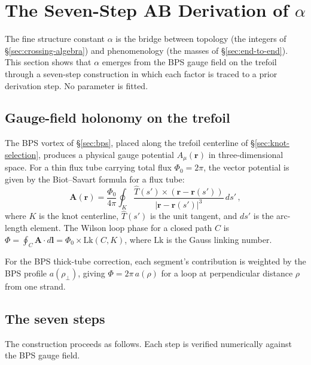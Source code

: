 \documentclass[11pt]{article}
\begin{document}
\section{The Seven-Step AB Derivation of $\alpha$}
\label{sec:holonomy}

The fine structure constant $\alpha$ is the bridge between topology
(the integers of \S\ref{sec:crossing-algebra}) and phenomenology
(the masses of \S\ref{sec:end-to-end}).  This section shows that
$\alpha$ emerges from the BPS gauge field on the trefoil through a
seven-step construction in which each factor is traced to a prior
derivation step.  No parameter is fitted.

\subsection{Gauge-field holonomy on the trefoil}

The BPS vortex of \S\ref{sec:bps}, placed along the trefoil
centerline of \S\ref{sec:knot-selection}, produces a physical
gauge potential $A_\mu(\mathbf{r})$ in three-dimensional space.
For a thin flux tube carrying total flux $\Phi_0 = 2\pi$, the
vector potential is given by the Biot--Savart formula for a flux
tube:
\begin{equation}
\label{eq:biot-savart}
  \mathbf{A}(\mathbf{r}) =
  \frac{\Phi_0}{4\pi}
  \oint_K \frac{\hat{T}(s') \times
    (\mathbf{r} - \mathbf{r}(s'))}{|\mathbf{r} - \mathbf{r}(s')|^3}
  \,ds'\,,
\end{equation}
where $K$ is the knot centerline, $\hat{T}(s')$ is the unit
tangent, and $ds'$ is the arc-length element.  The Wilson loop
phase for a closed path $C$ is
$\Phi = \oint_C \mathbf{A} \cdot d\mathbf{l}
= \Phi_0 \times \mathrm{Lk}(C, K)$,
where $\mathrm{Lk}$ is the Gauss linking number.

For the BPS thick-tube correction, each segment's contribution is
weighted by the BPS profile $a(\rho_\perp)$, giving
$\Phi = 2\pi \,a(\rho)$ for a loop at perpendicular distance
$\rho$ from one strand.

\subsection{The seven steps}
\label{sec:seven-steps}

The construction proceeds as follows.  Each step is verified
numerically against the BPS gauge field.
\end{document}
